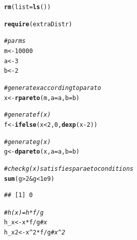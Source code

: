 \documentclass{article}\usepackage[]{graphicx}\usepackage[]{color}
\makeatletter
\newcommand{\hlnum}[1]{\textcolor[rgb]{0.686,0.059,0.569}{#1}}%
\newcommand{\hlcom}[1]{\textcolor[rgb]{0.678,0.584,0.686}{\textit{#1}}}%
\newcommand{\hlopt}[1]{\textcolor[rgb]{0,0,0}{#1}}%
\newcommand{\hlstd}[1]{\textcolor[rgb]{0.345,0.345,0.345}{#1}}%
\newcommand{\hlkwb}[1]{\textcolor[rgb]{0.69,0.353,0.396}{#1}}%
\newcommand{\hlkwc}[1]{\textcolor[rgb]{0.333,0.667,0.333}{#1}}%
\newcommand{\hlkwd}[1]{\textcolor[rgb]{0.737,0.353,0.396}{\textbf{#1}}}%
\newenvironment{kframe}{%
 \def\at@end@of@kframe{}%
 \ifinner\ifhmode%
  \def\at@end@of@kframe{\end{minipage}}%
  \begin{minipage}{\columnwidth}%
 \fi\fi%
 \def\FrameCommand##1{\hskip\@totalleftmargin \hskip-\fboxsep
 \colorbox{shadecolor}{##1}\hskip-\fboxsep
     \hskip-\linewidth \hskip-\@totalleftmargin \hskip\columnwidth}%
 \MakeFramed {\advance\hsize-\width
   \@totalleftmargin\z@ \linewidth\hsize
   \@setminipage}}%
 {\par\unskip\endMakeFramed%
 \at@end@of@kframe}
\newenvironment{knitrout}{}{} %
\makeatother
\begin{document}
\begin{knitrout}
\color{fgcolor}\begin{kframe}
\begin{alltt}
\hlkwd{rm}\hlstd{(}\hlkwc{list}\hlstd{=}\hlkwd{ls}\hlstd{())}

\hlkwd{require}\hlstd{(extraDistr)}

\hlcom{# parms}
\hlstd{m} \hlkwb{<-} \hlnum{10000}
\hlstd{a} \hlkwb{<-} \hlnum{3}
\hlstd{b} \hlkwb{<-} \hlnum{2}

\hlcom{#generate x according to parato}
\hlstd{x} \hlkwb{<-} \hlkwd{rpareto}\hlstd{(m,} \hlkwc{a} \hlstd{= a,} \hlkwc{b} \hlstd{= b)}

\hlcom{#generate f(x)}
\hlstd{f} \hlkwb{<-} \hlkwd{ifelse}\hlstd{(x} \hlopt{<} \hlnum{2}\hlstd{,} \hlnum{0}\hlstd{,} \hlkwd{dexp}\hlstd{(x} \hlopt{-} \hlnum{2}\hlstd{))}

\hlcom{#generate g(x)}
\hlstd{g} \hlkwb{<-} \hlkwd{dpareto}\hlstd{(x,} \hlkwc{a} \hlstd{= a,} \hlkwc{b} \hlstd{= b)}

\hlcom{#check g(x) satisfies paraeto conditions}
\hlkwd{sum}\hlstd{(g} \hlopt{>} \hlnum{2} \hlopt{&} \hlstd{g} \hlopt{<} \hlnum{1e9}\hlstd{)}
\end{alltt}
\begin{verbatim}
## [1] 0
\end{verbatim}
\begin{alltt}
\hlcom{#h(x) = h * f / g}
\hlstd{h_x} \hlkwb{<-} \hlstd{x}\hlopt{*}\hlstd{f}\hlopt{/}\hlstd{g} \hlcom{# x}
\hlstd{h_x2} \hlkwb{<-} \hlstd{x}\hlopt{^}\hlnum{2}\hlopt{*}\hlstd{f}\hlopt{/}\hlstd{g} \hlcom{# x^2}


\end{alltt}
\end{kframe}
\end{knitrout}
\end{document}
